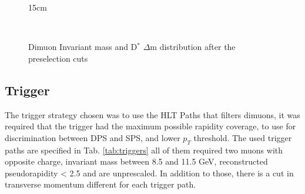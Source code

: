\begin{figure}[!htm]{15cm}
  \caption{Dimuon Invariant mass and D$^*$ $\Delta$m distribution after the preselection cuts}
  \label{fig:invmass_preselection}
  \hfill
  \\
\end{figure}

\subsection{Trigger}\label{sec:trigger}

The trigger strategy chosen was to use the HLT Paths that filters dimuons, it was required that the trigger had the maximum possible rapidity coverage, to use for discrimination between DPS and SPS, and lower $p_T$ threshold. The used trigger paths are specified in Tab. \ref{tab:triggers} all of them required two muons with opposite charge, invariant mass between 8.5 and 11.5 GeV, reconstructed pseudorapidity < 2.5 and are unprescaled. In addition to those, there is a cut in transverse momentum different for each trigger path.


